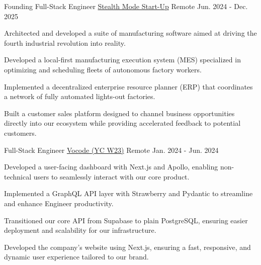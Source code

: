 \begin{cventries}
  \cventry
    {Founding Full-Stack Engineer} %
    {\href{https://google.com}{Stealth Mode Start-Up}} %
    {Remote} %
    {Jun. 2024 - Dec. 2025} %
    {
      \begin{cvitems} %
        \item {Architected and developed a suite of manufacturing software aimed at driving the fourth industrial revolution into reality.}
        \item {Developed a local-first manufacturing execution system (MES) specialized in optimizing and scheduling fleets of autonomous factory workers.}
        \item {Implemented a decentralized enterprise resource planner (ERP) that coordinates a network of fully automated lights-out factories.}
        \item {Built a customer sales platform designed to channel business opportunities directly into our ecosystem while providing accelerated feedback to potential customers.}
      \end{cvitems}
    }

  \cventry
    {Full-Stack Engineer} %
    {\href{https://vocode.dev}{Vocode (YC W23)}} %
    {Remote} %
    {Jan. 2024 - Jun. 2024} %
    {
      \begin{cvitems} %
        \item {Developed a user-facing dashboard with Next.js and Apollo, enabling non-technical users to seamlessly interact with our core product.}
        \item {Implemented a GraphQL API layer with Strawberry and Pydantic to streamline and enhance Engineer productivity.}
        \item {Transitioned our core API from Supabase to plain PostgreSQL, ensuring easier deployment and scalability for our infrastructure.}
        \item {Developed the company's website using Next.js, ensuring a fast, responsive, and dynamic user experience tailored to our brand.}
      \end{cvitems}
    }


\end{cventries}
